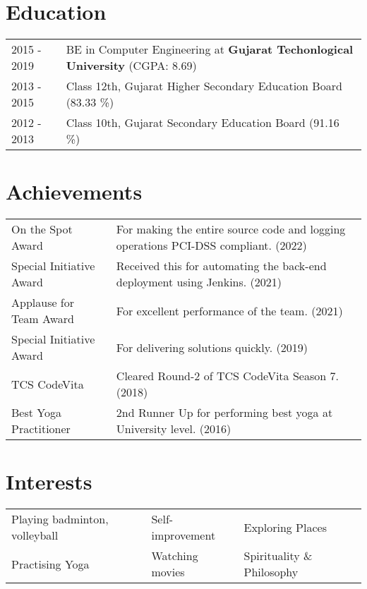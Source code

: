 \documentclass[a4paper,10.5pt]{article}
\begin{document}
\section{Education}
\begin{tabularx}{\linewidth}{@{}l X@{}}	
2015 - 2019 & BE in Computer Engineering at \textbf{Gujarat Techonlogical University} \hfill (CGPA: 8.69) \\
2013 - 2015 & Class 12th, Gujarat Higher Secondary Education Board \hfill (83.33 \%) \\
2012 - 2013 & Class 10th, Gujarat Secondary Education Board \hfill (91.16 \%) \\ 
\end{tabularx}

\section{Achievements}
\begin{tabularx}{\linewidth}{@{}l X@{}}	
On the Spot Award & For making the entire source code and logging operations PCI-DSS compliant. (2022) \\
Special Initiative Award & Received this for automating the back-end deployment using Jenkins. (2021) \\
Applause for Team Award & For excellent performance of the team. (2021) \\
Special Initiative Award & For delivering solutions quickly. (2019) \\
TCS CodeVita & Cleared Round-2 of TCS CodeVita Season 7. (2018) \\
Best Yoga Practitioner & 2nd Runner Up for performing best yoga at University level. (2016) \\
\end{tabularx}

\section{Interests}
\begin{tabularx}{\linewidth}{@{}X @{}X @{}X}	
Playing badminton, volleyball & Self-improvement & Exploring Places \\
Practising Yoga & Watching movies & Spirituality \& Philosophy\\
\end{tabularx}
\end{document}
